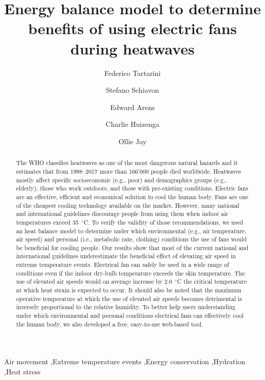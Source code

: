
\begin{frontmatter}

\title{Energy balance model to determine benefits of using electric fans during heatwaves}

\author[sinBerBest]{Federico Tartarini}
\author[CBE]{Stefano Schiavon}
\author[CBE]{Edward Arens}
\author[CBE]{Charlie Huizenga}
\author[USYD]{Ollie Jay}

\address[sinBerBest]{SinBerBEST, Berkeley Education Alliance for Research in Singapore, Singapore}
\address[CBE]{Center for the Built Environment, University of California, Berkeley, USA}
\address[USYD]{Sydney School ofHealth Sciences, Faculty ofMedicine and Health, The University ofSydney, Sydney, Australia}

\begin{abstract}
    The WHO classifies heatwaves as one of the most dangerous natural hazards and it estimates that from 1998--2017 more than 166'000 people died worldwide.
    Heatwaves mostly affect specific socioeconomic (e.g., poor) and demographics groups (e.g., elderly), those who work outdoors, and those with pre-existing conditions.
    Electric fans are an effective, efficient and economical solution to cool the human body.
    Fans are one of the cheapest cooling technology available on the market.
    However, many national and international guidelines discourage people from using them when indoor air temperatures exceed 35~$^{\circ}$C\@.
    To verify the validity of those recommendations, we used an heat balance model to determine under which environmental (e.g., air temperature, air speed) and personal (i.e., metabolic rate, clothing) conditions the use of fans would be beneficial for cooling people.
    Our results show that most of the current national and international guidelines underestimate the beneficial effect of elevating air speed in extreme temperature events.
    Electrical fan can safely be used in a wide range of conditions even if the indoor dry-bulb temperature exceeds the skin temperature.
    The use of elevated air speeds would on average increase by 2.0~$^{\circ}$C the critical temperature at which heat strain is expected to occur.
    It should also be noted that the maximum operative temperature at which the use of elevated air speeds becomes detrimental is inversely proportional to the relative humidity.
    To better help users understanding under which environmental and personal conditions electrical fans can effectively cool the human body, we also developed a free, easy-to-use web-based tool.
\end{abstract}

\begin{keyword}
Air movement \sep Extreme temperature events \sep Energy conservation \sep Hydration \sep Heat stress
\end{keyword}

\end{frontmatter}
